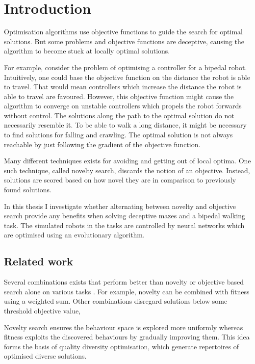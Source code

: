 \section{Introduction}

\label{sec:intro}

Optimisation algorithms use objective functions to guide the search for optimal solutions.
But some problems and objective functions are deceptive, causing the algorithm to become stuck at
locally optimal solutions.

For example, consider the problem of optimising a controller for a bipedal
robot. Intuitively, one could base the objective function on the distance the robot is able to travel.
That would mean controllers which increase the distance the robot is able to travel are favoured.
However, this objective function might cause the algorithm to converge on unstable controllers which
propels the robot forwards without control. The solutions along the path to the optimal solution
do not necessarily resemble it. To be able to walk a long distance, it might be necessary to find
solutions for falling and crawling. The optimal solution is not always reachable by just
following the gradient of the objective function.

Many different techniques exists for avoiding and getting out of local optima. One such technique, called
novelty search, discards the notion of an objective. Instead, solutions are scored based on how novel
they are in comparison to previously found solutions.

In this thesis I investigate whether alternating between novelty and objective search provide any
benefits when solving deceptive mazes and a bipedal walking task. The simulated robots in the tasks are
controlled by neural networks which are optimised using an evolutionary algorithm.

\todo{}


\subsection{Related work}
Several combinations exists that perform better than novelty or objective based search alone
on various tasks \cite{ns_study}. For example, novelty
can be combined with fitness using a weighted sum. Other combinations disregard solutions
below some threshold objective value,


Novelty search ensures the behaviour space is explored more uniformly whereas fitness exploits the discovered behaviours
by gradually improving them. This idea forms the basis of quality diversity optimisation,
which generate repertoires of optimised diverse solutions.

